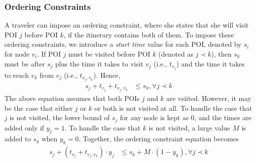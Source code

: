 \subsubsection{Ordering Constraints}
\label{eq:ordering}

A traveler can impose an ordering constraint, where she states that she will
visit POI $j$ before POI $k$, if the itinerary contains both of them.
To impose these ordering constraints, we introduce a \emph{start time} value for each POI, denoted by $s_i$ for node $v_i$.
If POI $j$ must be visited before POI $k$ (denoted as $j \prec k$), then $s_k$ must be after $s_j$ plus
the time it takes to visit $v_j$ (i.e., $t_{v_j}$) and the time it takes to
reach $v_k$ from $v_j$ (i.e., $t_{v_j,v_k}$).
Hence,
%
\begin{align}
	s_j + t_{v_j} + t_{v_j,v_k} & \leq s_k, \forall j \prec k
\end{align}
%
The above equation assumes that both POIs $j$ and $k$ are vsiited.
However, it may be the case that either $j$ or $k$ or both is not visited at all.
To handle the case that $j$ is not visited, the lower bound of $s_j$ for any
node is kept as $0$, and the times are added only if $y_j = 1$.
To handle the case that $k$ is not visited, a large value $M$ is added to $s_k$
when $y_k = 0$.
Together, the ordering constraint equation becomes
%
\begin{align}
	\label{eq:ordering}
	s_j + (t_{v_j} + t_{v_j,v_k}) \cdot y_j & \leq s_k + M \cdot (1 - y_k), \forall j \prec k
\end{align}
%


